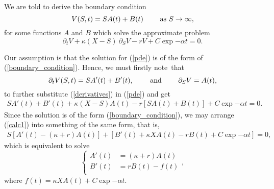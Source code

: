 \noindent We are told to derive the boundary condition 
	\begin{equation}\label{boundary_condition}
		V(S, t) = S A(t) + B(t) \quad\quad \text{ as } S\to \infty,
	\end{equation}
for some functions $A$ and $B$ which solve the approximate problem
	\begin{equation}\label{pde}
		\partial_t V + \kappa (X - S) \ \partial_S V - rV + C \exp{-\alpha t} = 0.
	\end{equation}

Our assumption is that the solution for (\ref{pde}) is of the form of (\ref{boundary_condition}). Hence, we must firstly note~that
	\begin{equation}\label{derivatives}
		\partial_t V (S, t) = S A'(t) + B'(t), \quad\quad \text{ and } \quad\quad \partial_S V = A(t),
	\end{equation}
to further substitute (\ref{derivatives}) in (\ref{pde}) and get
	\begin{equation}\label{calc1}
		\begin{aligned}
			S A'(t) + B'(t) + \kappa (X - S) A(t) - r \left[ S A(t) + B(t)\right] + C\exp{-\alpha t} = 0.
		\end{aligned}
	\end{equation}
Since the solution is of the form (\ref{boundary_condition}), we may arrange (\ref{calc1}) into something of the same form, that is,
	\begin{equation}\label{calc2}
		\begin{aligned}
			S \left[A'(t) - (\kappa + r) A(t) \right] + \left[ B'(t) + \kappa X A(t) - rB(t) + C\exp{-\alpha t}\right] = 0,
		\end{aligned}
	\end{equation}
which is equivalent to solve
	\begin{equation}
		\begin{cases}
			A'(t) &=  (\kappa + r) A(t) \\
			B'(t) &= rB(t)  - f(t) \\
		\end{cases},
	\end{equation}
where $f(t) = \kappa X A(t) + C\exp{-\alpha t}$.

